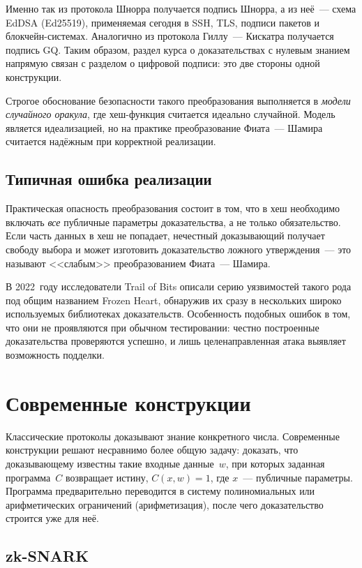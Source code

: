 \documentclass[14pt,a4paper]{extarticle}
\begin{document}
Именно так из протокола Шнорра получается подпись Шнорра, а из неё~--- схема EdDSA
(Ed25519), применяемая сегодня в SSH, TLS, подписи пакетов и блокчейн-системах.
Аналогично из протокола Гиллу~--- Кискатра получается подпись GQ. Таким образом,
раздел курса о доказательствах с нулевым знанием напрямую связан с разделом о цифровой
подписи: это две стороны одной конструкции.

Строгое обоснование безопасности такого преобразования выполняется в \emph{модели
случайного оракула}, где хеш-функция считается идеально случайной. Модель является
идеализацией, но на практике преобразование Фиата~--- Шамира считается надёжным при
корректной реализации.

\subsection{Типичная ошибка реализации}

Практическая опасность преобразования состоит в том, что в хеш необходимо включать
\emph{все} публичные параметры доказательства, а не только обязательство. Если часть
данных в хеш не попадает, нечестный доказывающий получает свободу выбора и может
изготовить доказательство ложного утверждения~--- это называют <<слабым>>
преобразованием Фиата~--- Шамира.

В 2022~году исследователи Trail of Bits описали серию уязвимостей такого рода под общим
названием Frozen Heart, обнаружив их сразу в нескольких широко используемых
библиотеках доказательств. Особенность подобных ошибок в том, что они не проявляются
при обычном тестировании: честно построенные доказательства проверяются успешно, и лишь
целенаправленная атака выявляет возможность подделки.

\section{Современные конструкции}

Классические протоколы доказывают знание конкретного числа. Современные конструкции
решают несравнимо более общую задачу: доказать, что доказывающему известны такие
входные данные~$w$, при которых заданная программа~$C$ возвращает истину,
$C(x, w) = 1$, где $x$~--- публичные параметры. Программа предварительно
переводится в систему полиномиальных или арифметических ограничений (арифметизация),
после чего доказательство строится уже для неё.

\subsection{zk-SNARK}
\end{document}
